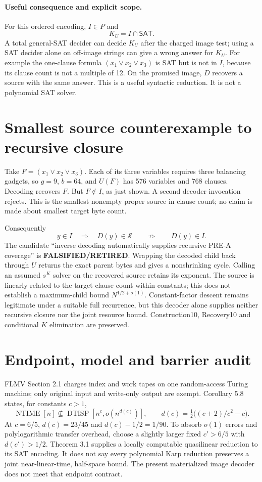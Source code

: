 \documentclass[11pt]{article}
\newcommand{\SAT}{\mathsf{SAT}}
\begin{document}
\paragraph{Useful consequence and explicit scope.}
For this ordered encoding, $I\in P$ and
\[
 K_U=I\cap\SAT.
\]
A total general-SAT decider can decide $K_U$ after the charged image test;
using a SAT decider alone on off-image strings can give a wrong answer for
$K_U$. For example the one-clause formula $(x_1\lor x_2\lor x_3)$ is SAT
but is not in $I$, because its clause count is not a multiple of 12.
On the promised image, $D$ recovers a source with the same answer.
This is a useful syntactic reduction. It is not a polynomial SAT solver.

\section{Smallest source counterexample to recursive closure}
Take $F=(x_1\lor x_2\lor x_3)$. Each of its three variables requires three
balancing gadgets, so $g=9$, $b=64$, and $U(F)$ has 576 variables and 768
clauses. Decoding recovers $F$. But $F\notin I$, as just shown. A second
decoder invocation rejects. This is the smallest nonempty proper source in
clause count; no claim is made about smallest target byte count.

Consequently
\[
 y\in I\quad\Longrightarrow\quad D(y)\in\mathcal S
 \qquad\not\Longrightarrow\qquad D(y)\in I.
\]
The candidate ``inverse decoding automatically supplies recursive PRE-A
coverage'' is \textbf{FALSIFIED/RETIRED}. Wrapping the decoded child back
through $U$ returns the exact parent bytes and gives a nonshrinking cycle.
Calling an assumed $s^K$ solver on the recovered source retains its exponent.
The source is linearly related to the target clause count within constants;
this does not establish a maximum-child bound $N^{1/2+o(1)}$.
Constant-factor descent remains legitimate under a suitable full recurrence,
but this decoder alone supplies neither recursive closure nor the joint
resource bound. Construction10, Recovery10 and conditional $K$ elimination
are preserved.

\section{Endpoint, model and barrier audit}
FLMV Section 2.1 charges index and work tapes on one random-access Turing
machine; only original input and write-only output are exempt. Corollary 5.8
states, for constants $c>1$,
\[
 \operatorname{NTIME}[n]\not\subseteq
 \operatorname{DTISP}[n^c,o(n^{d(c)})],\qquad
 d(c)=\tfrac12\bigl((c+2)/c^2-c\bigr).
\]
At $c=6/5$, $d(c)=23/45$ and $d(c)-1/2=1/90$. To absorb $o(1)$ errors and
polylogarithmic transfer overhead, choose a slightly larger fixed $c'>6/5$
with $d(c')>1/2$. Theorem 3.1 supplies a locally computable quasilinear
reduction to its SAT encoding. It does not say every polynomial Karp
reduction preserves a joint near-linear-time, half-space bound.
The present materialized image decoder does not meet that endpoint contract.
\end{document}
